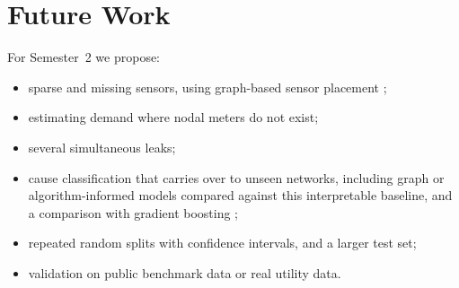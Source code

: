 \documentclass[11pt,letterpaper]{report}
\theoremstyle{definition}
\theoremstyle{plain}
\theoremstyle{remark}
\begin{document}
\section{Future Work}
For Semester~2 we propose:
\begin{itemize}
\item sparse and missing sensors, using graph-based sensor placement \cite{leonzio2026centrality,vangemert2026sensorplacement};
\item estimating demand where nodal meters do not exist;
\item several simultaneous leaks;
\item cause classification that carries over to unseen networks, including graph or algorithm-informed models \cite{zhang2026aignn} compared against this interpretable baseline, and a comparison with gradient boosting \cite{marvin2023hgb};
\item repeated random splits with confidence intervals, and a larger test set;
\item validation on public benchmark data \cite{vrachimis2018leakdb,vrachimis2022battledim} or real utility data.
\end{itemize}
\end{document}
